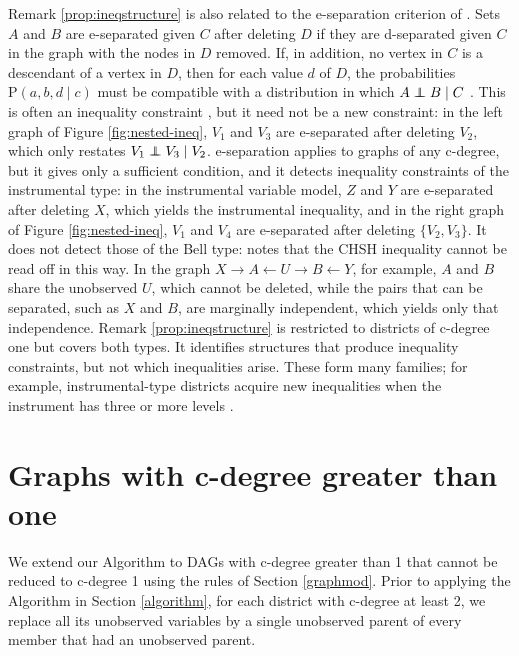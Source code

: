 \documentclass[12pt]{article}
\newcommand\indep{\protect\mathpalette{\protect\independenT}{\perp}}
\def\independenT#1#2{\mathrel{\rlap{$#1#2$}\mkern2mu{#1#2}}}
\def\Pr{{\mathrm{P}}}
\begin{document}
Remark \ref{prop:ineqstructure} is also related to the e-separation criterion of \citet{evans2012graphical}. Sets $A$ and $B$ are e-separated given $C$ after deleting $D$ if they are d-separated given $C$ in the graph with the nodes in $D$ removed. If, in addition, no vertex in $C$ is a descendant of a vertex in $D$, then for each value $d$ of $D$, the probabilities $\Pr(a, b, d \mid c)$ must be compatible with a distribution in which $A \indep B \mid C$ \citep[Theorem 4.2]{evans2012graphical}. This is often an inequality constraint \citep{evans2012graphical, finkelstein2021entropic}, but it need not be a new constraint: in the left graph of Figure \ref{fig:nested-ineq}, $V_1$ and $V_3$ are e-separated after deleting $V_2$, which only restates $V_1 \indep V_3 \mid V_2$. e-separation applies to graphs of any c-degree, but it gives only a sufficient condition, and it detects inequality constraints of the instrumental type: in the instrumental variable model, $Z$ and $Y$ are e-separated after deleting $X$, which yields the instrumental inequality, and in the right graph of Figure \ref{fig:nested-ineq}, $V_1$ and $V_4$ are e-separated after deleting $\{V_2, V_3\}$. It does not detect those of the Bell type: \citet[Remark 2.6]{evans2023latent} notes that the CHSH inequality cannot be read off in this way. In the graph $X \rightarrow A \leftarrow U \rightarrow B \leftarrow Y$, for example, $A$ and $B$ share the unobserved $U$, which cannot be deleted, while the pairs that can be separated, such as $X$ and $B$, are marginally independent, which yields only that independence. Remark \ref{prop:ineqstructure} is restricted to districts of c-degree one but covers both types. It identifies structures that produce inequality constraints, but not which inequalities arise. These form many families; for example, instrumental-type districts acquire new inequalities when the instrument has three or more levels \citep{bonet2001instrumentality}.


\section{Graphs with c-degree greater than one}
\label{sec:nonlin}
We extend our Algorithm to DAGs with c-degree greater than 1 that cannot be reduced to c-degree 1 using the rules of Section \ref{graphmod}. Prior to applying the Algorithm in Section \ref{algorithm}, for each district with c-degree at least 2, we replace all its unobserved variables by a single unobserved parent of every member that had an unobserved parent.
\end{document}
